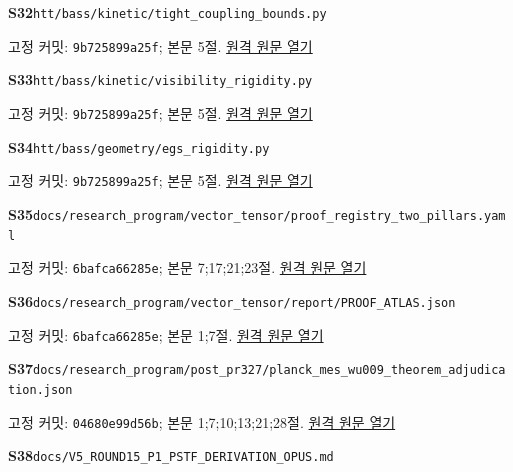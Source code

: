 \documentclass[11pt,a4paper]{article}
\begin{document}
\hypertarget{src:S32}{}\textbf{S32}\quad \nolinkurl{htt/bass/kinetic/tight_coupling_bounds.py}\par
{\small 고정 커밋: \texttt{9b725899a25f}; 본문 5절. \href{https://github.com/cosmosapjw-quantum/htt_base/blob/9b725899a25fa410e7c3686ce36afaa667d14646/htt/bass/kinetic/tight_coupling_bounds.py}{원격 원문 열기}}\par
\hypertarget{src:S33}{}\textbf{S33}\quad \nolinkurl{htt/bass/kinetic/visibility_rigidity.py}\par
{\small 고정 커밋: \texttt{9b725899a25f}; 본문 5절. \href{https://github.com/cosmosapjw-quantum/htt_base/blob/9b725899a25fa410e7c3686ce36afaa667d14646/htt/bass/kinetic/visibility_rigidity.py}{원격 원문 열기}}\par
\hypertarget{src:S34}{}\textbf{S34}\quad \nolinkurl{htt/bass/geometry/egs_rigidity.py}\par
{\small 고정 커밋: \texttt{9b725899a25f}; 본문 5절. \href{https://github.com/cosmosapjw-quantum/htt_base/blob/9b725899a25fa410e7c3686ce36afaa667d14646/htt/bass/geometry/egs_rigidity.py}{원격 원문 열기}}\par
\hypertarget{src:S35}{}\textbf{S35}\quad \nolinkurl{docs/research_program/vector_tensor/proof_registry_two_pillars.yaml}\par
{\small 고정 커밋: \texttt{6bafca66285e}; 본문 7;17;21;23절. \href{https://github.com/cosmosapjw-quantum/htt_base/blob/6bafca66285ef071081453313bb7d2d6b261599c/docs/research_program/vector_tensor/proof_registry_two_pillars.yaml}{원격 원문 열기}}\par
\hypertarget{src:S36}{}\textbf{S36}\quad \nolinkurl{docs/research_program/vector_tensor/report/PROOF_ATLAS.json}\par
{\small 고정 커밋: \texttt{6bafca66285e}; 본문 1;7절. \href{https://github.com/cosmosapjw-quantum/htt_base/blob/6bafca66285ef071081453313bb7d2d6b261599c/docs/research_program/vector_tensor/report/PROOF_ATLAS.json}{원격 원문 열기}}\par
\hypertarget{src:S37}{}\textbf{S37}\quad \nolinkurl{docs/research_program/post_pr327/planck_mes_wu009_theorem_adjudication.json}\par
{\small 고정 커밋: \texttt{04680e99d56b}; 본문 1;7;10;13;21;28절. \href{https://github.com/cosmosapjw-quantum/htt_base/blob/04680e99d56b9974fe1120854370af1fb94fb1d6/docs/research_program/post_pr327/planck_mes_wu009_theorem_adjudication.json}{원격 원문 열기}}\par
\hypertarget{src:S38}{}\textbf{S38}\quad \nolinkurl{docs/V5_ROUND15_P1_PSTF_DERIVATION_OPUS.md}\par
\end{document}
